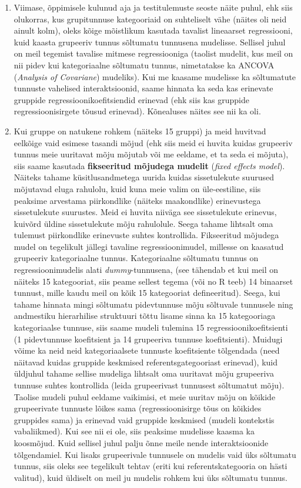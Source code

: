 \documentclass[
]{book}
\begin{document}
\begin{enumerate}
\def\labelenumi{\arabic{enumi}.}
\item
  Viimase, õppimisele kulunud aja ja testitulemuste seoste näite puhul, ehk siis olukorras, kus grupitunnuse kategooriaid on suhteliselt vähe (näites oli neid ainult kolm), oleks kõige mõistlikum kasutada tavalist lineaarset regressiooni, kuid kaasta grupeeriv tunnus sõltumatu tunnusena mudelisse. Sellisel juhul on meil tegemist tavalise mitmese regressiooniga (taolist mudelit, kus meil on nii pidev kui kategoriaalne sõltumatu tunnus, nimetatakse ka ANCOVA (\emph{Analysis of Covariane}) mudeliks). Kui me kaasame mudelisse ka sõltumatute tunnuste vahelised interaktsioonid, saame hinnata ka seda kas erinevate gruppide regressioonikoefitsiendid erinevad (ehk siis kas gruppide regressioonisirgete tõusud erinevad). Kõnealuses näites see nii ka oli.
\item
  Kui gruppe on natukene rohkem (näiteks 15 gruppi) ja meid huvitvad eelkõige vaid esimese tasandi mõjud (ehk siis meid ei huvita kuidas grupeeriv tunnus meie uuritavat mõju mõjutab või me eeldame, et ta seda ei mõjuta), siis saame kasutada \textbf{fikseeritud mõjudega mudelit} (\emph{fixed effects model}). Näiteks tahame küsitlusandmetega uurida kuidas sissetulekute suurused mõjutavad eluga rahulolu, kuid kuna meie valim on üle-eestiline, siis peaksime arvestama piirkondlike (näiteks maakondlike) erinevustega sissetulekute suurustes. Meid ei huvita niiväga see sissetulekute erinevus, kuivõrd üldine sissetulekute mõju rahulolule. Seega tahame lihtsalt oma tulemust piirkondlike erinevuste suhtes kontrollida. Fikseeritud mõjudega mudel on tegelikult jällegi tavaline regressioonimudel, millesse on kaasatud grupeeriv kategoriaalne tunnus. Kategoriaalne sõltumatu tunnus on regressioonimudelis alati \emph{dummy}-tunnusena, (see tähendab et kui meil on näiteks 15 kategooriat, siis peame sellest tegema (või no R teeb) 14 binaarset tunnust, mille kaudu meil on kõik 15 kategooriat defineeritud). Seega, kui tahame hinnata mingi sõltumatu pidevtunnuse mõju sõltuvale tunnusele ning andmestiku hierarhilise struktuuri tõttu lisame sinna ka 15 kategooriaga kategoriaalse tunnuse, siis saame mudeli tulemina 15 regressioonikoefitsienti (1 pidevtunnuse koefitsient ja 14 grupeeriva tunnuse koefitsienti). Muidugi võime ka neid neid kategoriaalsete tunnuste koefitsiente tõlgendada (need näitavad kuidas gruppide keskmised referentsgategooriast erinevad), kuid üldjuhul tahame sellise mudeliga lihtsalt oma uuritavat mõju grupeeriva tunnuse suhtes kontrollida (leida grupeerivast tunnusest sõltumatut mõju). Taolise mudeli puhul eeldame vaikimisi, et meie uuritav mõju on kõikide grupeerivate tunnuste lõikes sama (regressioonisirge tõus on kõikides gruppides sama) ja erinevad vaid gruppide keskmised (mudeli kontekstis vabaliikmed). Kui see nii ei ole, siis peaksime mudelisse kaasma ka koosmõjud. Kuid sellisel juhul palju õnne meile nende interaktsioonide tõlgendamiel. Kui lisaks grupeerivale tunnusele on mudelis vaid üks sõltumatu tunnus, siis oleks see tegelikult tehtav (eriti kui referentskategooria on hästi valitud), kuid üldiselt on meil ju mudelis rohkem kui üks sõltumatu tunnus.

\end{enumerate}
\end{document}
